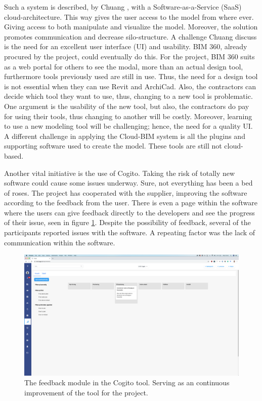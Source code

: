 Such a system is described, by Chuang \cite{chuang2011applying}, with a Software-as-a-Service (SaaS) cloud-architecture. This way gives the user access to the model from where ever. Giving access to both manipulate and visualize the model. Moreover, the solution promotes communication and decrease silo-structure. A challenge Chuang discuss is the need for an excellent user interface (UI) and usability. BIM 360, already procured by the project, could eventually do this. For the project, BIM 360 suits as a web portal for others to see the modal, more than an actual design tool, furthermore tools previously used are still in use. Thus, the need for a design tool is not essential when they can use Revit and ArchiCad. Also, the contractors can decide which tool they want to use, thus, changing to a new tool is problematic. One argument is the usability of the new tool, but also, the contractors do pay for using their tools, thus changing to another will be costly. Moreover, learning to use a new modeling tool will be challenging; hence, the need for a quality UI. A different challenge in applying the Cloud-BIM system is all the plugins and supporting software used to create the model. These tools are still not cloud-based.

Another vital initiative is the use of Cogito. Taking the risk of totally new software could cause some issues underway. Sure, not everything has been a bed of roses. The project has cooperated with the supplier, improving the software according to the feedback from the user. There is even a page within the software where the users can give feedback directly to the developers and see the progress of their issue, seen in figure \ref{fig:cogito_feedback}. Despite the possibility of feedback, several of the participants reported issues with the software. A repeating factor was the lack of communication within the software. 

\begin{figure}
    \centering
    \includegraphics[width=\textwidth]{fig/cogitos_feedback.png}
    \caption{The feedback module in the Cogito tool. Serving as an continuous improvement of the tool for the project.}
    \label{fig:cogito_feedback}
\end{figure}

